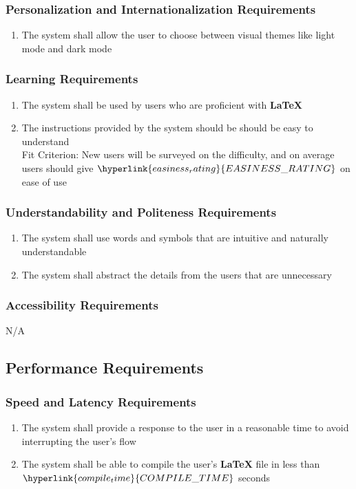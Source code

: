 \documentclass[12pt, titlepage]{article}
\begin{document}
	\subsubsection{Personalization and Internationalization Requirements}
	\begin{enumerate}[resume*]
		\item The system shall allow the user to choose between visual themes like light mode and dark mode
	\end{enumerate}
	\subsubsection{Learning Requirements}
	\begin{enumerate}[resume*]
		\item The system shall be used by users who are proficient with \textbf{LaTeX}
		\item The instructions provided by the system should be should be easy to understand\\
		{\color{red}Fit Criterion: New users will be surveyed on the difficulty, and on average users should give $\hyperlink{easiness_rating}{EASINESS\_RATING}$ on ease of use}
	\end{enumerate}
	\subsubsection{Understandability and Politeness Requirements}
	\begin{enumerate}[resume*]
		\item The system shall use words and symbols that are intuitive and naturally understandable
		\item The system shall abstract the details from the users that are unnecessary
	\end{enumerate}
	\subsubsection{Accessibility Requirements}
	N/A
	\subsection{Performance Requirements}
	\subsubsection{Speed and Latency Requirements}
	\begin{enumerate}[resume*]
		\item The system shall provide a response to the user in a reasonable time to avoid interrupting the user's flow
		\item The system shall be able to compile the user's \textbf{LaTeX} file in less than $\hyperlink{compile_time}{COMPILE\_TIME}$ seconds\\
	\end{enumerate}
\end{document}
